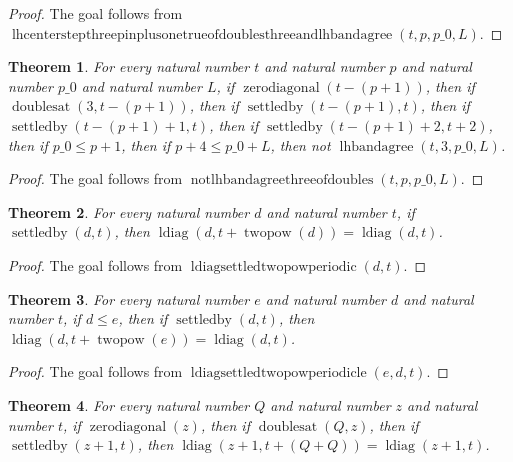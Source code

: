 \documentclass[11pt]{article}
\newtheorem{theorem}{Theorem}[section]
\theoremstyle{definition}
\begin{document}
\begin{proof}
The goal follows from \(\operatorname{lhcenterstepthreepinplusonetrueofdoublesthreeandlhbandagree}(t, p, p\_0, L)\).
\end{proof}
\begin{theorem}
\label{ll:paper:not-lhbandagree-three-of-doubles}
For every natural number \(t\) and natural number \(p\) and natural number \(p\_0\) and natural number \(L\), if \(\operatorname{zerodiagonal}(t - (p + 1))\), then if \(\operatorname{doublesat}(3, t - (p + 1))\), then if \(\operatorname{settledby}(t - (p + 1), t)\), then if \(\operatorname{settledby}(t - (p + 1) + 1, t)\), then if \(\operatorname{settledby}(t - (p + 1) + 2, t + 2)\), then if \(p\_0 \le p + 1\), then if \(p + 4 \le p\_0 + L\), then not \(\operatorname{lhbandagree}(t, 3, p\_0, L)\).
\end{theorem}
\begin{proof}
The goal follows from \(\operatorname{notlhbandagreethreeofdoubles}(t, p, p\_0, L)\).
\end{proof}
\begin{theorem}
\label{ll:paper:ldiag-settled-twopow-periodic}
For every natural number \(d\) and natural number \(t\), if \(\operatorname{settledby}(d, t)\), then \(\operatorname{ldiag}(d, t + \operatorname{twopow}(d)) = \operatorname{ldiag}(d, t)\).
\end{theorem}
\begin{proof}
The goal follows from \(\operatorname{ldiagsettledtwopowperiodic}(d, t)\).
\end{proof}
\begin{theorem}
\label{ll:paper:ldiag-settled-twopow-periodic-le}
For every natural number \(e\) and natural number \(d\) and natural number \(t\), if \(d \le e\), then if \(\operatorname{settledby}(d, t)\), then \(\operatorname{ldiag}(d, t + \operatorname{twopow}(e)) = \operatorname{ldiag}(d, t)\).
\end{theorem}
\begin{proof}
The goal follows from \(\operatorname{ldiagsettledtwopowperiodicle}(e, d, t)\).
\end{proof}
\begin{theorem}
\label{ll:paper:ldiag-settled-two-mul-periodic-of-doubles}
For every natural number \(Q\) and natural number \(z\) and natural number \(t\), if \(\operatorname{zerodiagonal}(z)\), then if \(\operatorname{doublesat}(Q, z)\), then if \(\operatorname{settledby}(z + 1, t)\), then \(\operatorname{ldiag}(z + 1, t + (Q + Q)) = \operatorname{ldiag}(z + 1, t)\).
\end{theorem}
\end{document}
